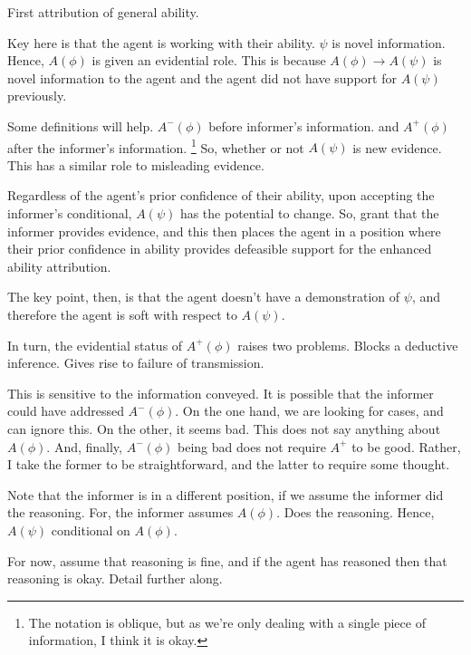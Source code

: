 \documentclass[10pt]{article}
\begin{document}
First attribution of general ability.

\begin{note}
Key here is that the agent is working with their ability.
\(\psi\) is novel information.
Hence, \(A(\phi)\) is given an evidential role.
This is because \(A(\phi) \rightarrow A(\psi)\) is novel information to the agent and the agent did not have support for \(A(\psi)\) previously.

Some definitions will help.
\(A^{-}(\phi)\) before informer's information.
and
\(A^{+}(\phi)\) after the informer's information.\nolinebreak
\footnote{
  The notation is oblique, but as we're only dealing with a single piece of information, I think it is okay.
}
So, whether or not \(A(\psi)\) is new evidence.
This has a similar role to misleading evidence.

Regardless of the agent's prior confidence of their ability, upon accepting the informer's conditional, \(A(\psi)\) has the potential to change.
So, grant that the informer provides evidence, and this then places the agent in a position where their prior confidence in ability provides defeasible support for the enhanced ability attribution.

The key point, then, is that the agent doesn't have a demonstration of \(\psi\), and therefore the agent is soft with respect to \(A(\psi)\).

In turn, the evidential status of \(A^{+}(\phi)\) raises two problems.
Blocks a deductive inference.
Gives rise to failure of transmission.

This is sensitive to the information conveyed.
It is possible that the informer could have addressed \(A^{-}(\phi)\).
On the one hand, we are looking for cases, and can ignore this.
On the other, it seems bad.
This does not say anything about \(A(\phi)\).
And, finally, \(A^{-}(\phi)\) being bad does not require \(A^{{+}}\) to be good.
Rather, I take the former to be straightforward, and the latter to require some thought.
\end{note}

\begin{note}
  Note that the informer is in a different position, if we assume the informer did the reasoning.
  For, the informer assumes \(A(\phi)\).
  Does the reasoning.
  Hence, \(A(\psi)\) conditional on \(A(\phi)\).

  For now, assume that reasoning is fine, and if the agent has reasoned then that reasoning is okay.
  Detail further along.
\end{note}
\end{document}

